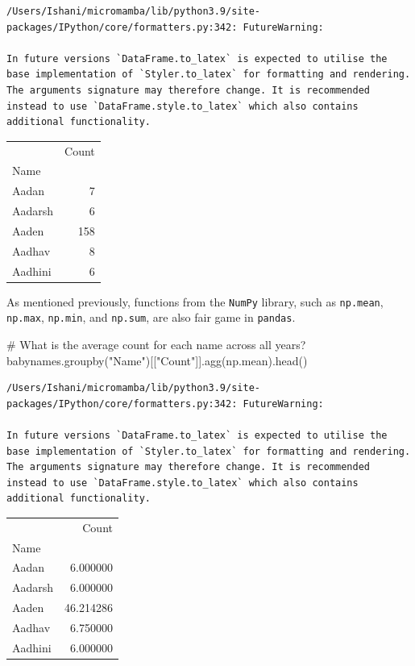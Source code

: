 \documentclass[
  letterpaper,
  DIV=11,
  numbers=noendperiod]{scrreprt}
\newenvironment{Shaded}{\begin{snugshade}}{\end{snugshade}}
\newcommand{\CommentTok}[1]{\textcolor[rgb]{0.37,0.37,0.37}{#1}}
\newcommand{\NormalTok}[1]{\textcolor[rgb]{0.00,0.23,0.31}{#1}}
\newcommand{\StringTok}[1]{\textcolor[rgb]{0.13,0.47,0.30}{#1}}
\begin{document}
\begin{verbatim}
/Users/Ishani/micromamba/lib/python3.9/site-packages/IPython/core/formatters.py:342: FutureWarning:

In future versions `DataFrame.to_latex` is expected to utilise the base implementation of `Styler.to_latex` for formatting and rendering. The arguments signature may therefore change. It is recommended instead to use `DataFrame.style.to_latex` which also contains additional functionality.
\end{verbatim}

\begin{tabular}{lr}
\toprule
{} &  Count \\
Name    &        \\
\midrule
Aadan   &      7 \\
Aadarsh &      6 \\
Aaden   &    158 \\
Aadhav  &      8 \\
Aadhini &      6 \\
\bottomrule
\end{tabular}

As mentioned previously, functions from the \texttt{NumPy} library, such
as \texttt{np.mean}, \texttt{np.max}, \texttt{np.min}, and
\texttt{np.sum}, are also fair game in \texttt{pandas}.

\begin{Shaded}
\begin{Highlighting}[]
\CommentTok{\# What is the average count for each name across all years?}
\NormalTok{babynames.groupby(}\StringTok{"Name"}\NormalTok{)[[}\StringTok{"Count"}\NormalTok{]].agg(np.mean).head()}
\end{Highlighting}
\end{Shaded}

\begin{verbatim}
/Users/Ishani/micromamba/lib/python3.9/site-packages/IPython/core/formatters.py:342: FutureWarning:

In future versions `DataFrame.to_latex` is expected to utilise the base implementation of `Styler.to_latex` for formatting and rendering. The arguments signature may therefore change. It is recommended instead to use `DataFrame.style.to_latex` which also contains additional functionality.
\end{verbatim}

\begin{tabular}{lr}
\toprule
{} &      Count \\
Name    &            \\
\midrule
Aadan   &   6.000000 \\
Aadarsh &   6.000000 \\
Aaden   &  46.214286 \\
Aadhav  &   6.750000 \\
Aadhini &   6.000000 \\
\bottomrule
\end{tabular}
\end{document}
